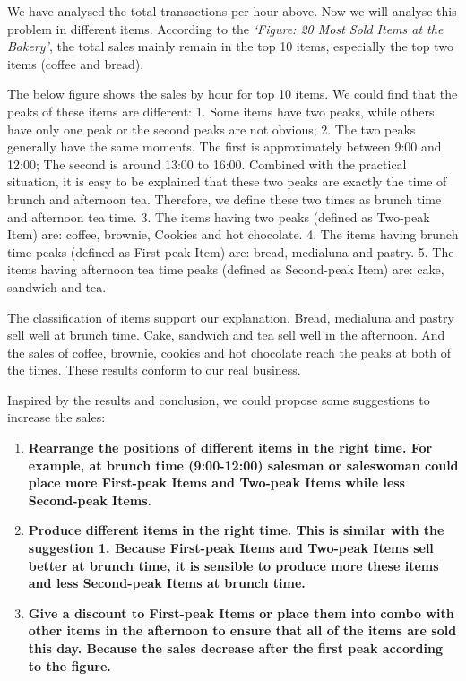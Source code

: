 \documentclass[11pt]{article}
\providecommand{\tightlist}{%
      \setlength{\itemsep}{0pt}\setlength{\parskip}{0pt}}
\begin{document}
We have analysed the total transactions per hour above. Now we will
analyse this problem in different items. According to the \emph{`Figure:
20 Most Sold Items at the Bakery'}, the total sales mainly remain in the
top 10 items, especially the top two items (coffee and bread).

The below figure shows the sales by hour for top 10 items. We could find
that the peaks of these items are different: 1. Some items have two
peaks, while others have only one peak or the second peaks are not
obvious; 2. The two peaks generally have the same moments. The first is
approximately between 9:00 and 12:00; The second is around 13:00 to
16:00. Combined with the practical situation, it is easy to be explained
that these two peaks are exactly the time of brunch and afternoon tea.
Therefore, we define these two times as brunch time and afternoon tea
time. 3. The items having two peaks (defined as Two-peak Item) are:
coffee, brownie, Cookies and hot chocolate. 4. The items having brunch
time peaks (defined as First-peak Item) are: bread, medialuna and
pastry. 5. The items having afternoon tea time peaks (defined as
Second-peak Item) are: cake, sandwich and tea.

The classification of items support our explanation. Bread, medialuna
and pastry sell well at brunch time. Cake, sandwich and tea sell well in
the afternoon. And the sales of coffee, brownie, cookies and hot
chocolate reach the peaks at both of the times. These results conform to
our real business.

Inspired by the results and conclusion, we could propose some
suggestions to increase the sales:

\begin{enumerate}
\def\labelenumi{\arabic{enumi}.}
\tightlist
\item
  \textbf{Rearrange the positions of different items in the right time.
  For example, at brunch time (9:00-12:00) salesman or saleswoman could
  place more First-peak Items and Two-peak Items while less Second-peak
  Items.}
\item
  \textbf{Produce different items in the right time. This is similar
  with the suggestion 1. Because First-peak Items and Two-peak Items
  sell better at brunch time, it is sensible to produce more these items
  and less Second-peak Items at brunch time.}
\item
  \textbf{Give a discount to First-peak Items or place them into combo
  with other items in the afternoon to ensure that all of the items are
  sold this day. Because the sales decrease after the first peak
  according to the figure.}
\end{enumerate}
\end{document}
